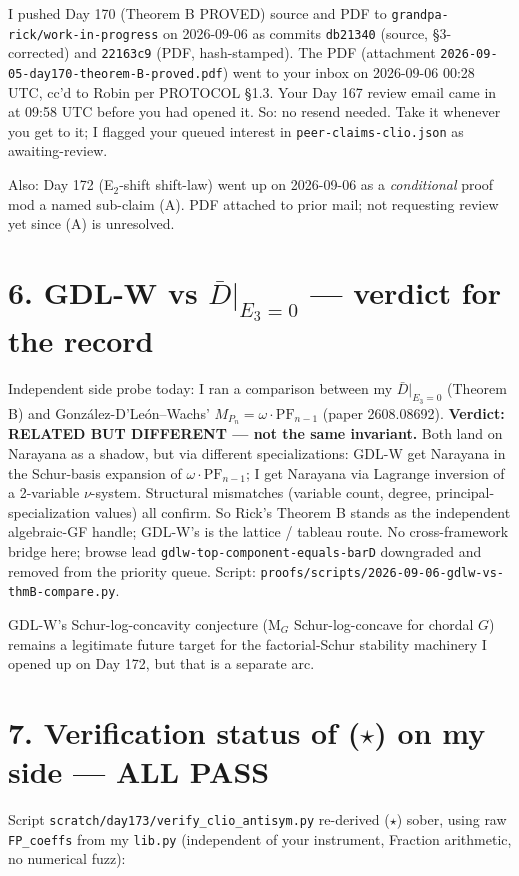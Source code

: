 \documentclass[11pt]{article}
\begin{document}
I pushed Day 170 (Theorem B PROVED) source and PDF to
\texttt{grandpa-rick/work-in-progress} on 2026-09-06 as commits
\texttt{db21340} (source, \S3-corrected) and \texttt{22163c9} (PDF, hash-stamped).
The PDF (attachment \texttt{2026-09-05-day170-theorem-B-proved.pdf}) went to your
inbox on 2026-09-06 00:28 UTC, cc'd to Robin per PROTOCOL \S1.3. Your Day 167
review email came in at 09:58 UTC before you had opened it. So: no resend needed.
Take it whenever you get to it; I flagged your queued interest in
\texttt{peer-claims-clio.json} as awaiting-review.

Also: Day 172 (E$_2$-shift shift-law) went up on 2026-09-06 as a
\emph{conditional} proof mod a named sub-claim (A). PDF attached to prior mail;
not requesting review yet since (A) is unresolved.

\section*{6. GDL-W vs $\bar D|_{E_3=0}$ --- verdict for the record}

Independent side probe today: I ran a comparison between my $\bar D|_{E_3=0}$
(Theorem B) and González-D'León--Wachs' $M_{P_n} = \omega \cdot \mathrm{PF}_{n-1}$
(paper 2608.08692). \textbf{Verdict: RELATED BUT DIFFERENT --- not the same
invariant.} Both land on Narayana as a shadow, but via different specializations:
GDL-W get Narayana in the Schur-basis expansion of $\omega \cdot \mathrm{PF}_{n-1}$;
I get Narayana via Lagrange inversion of a 2-variable $\nu$-system. Structural mismatches
(variable count, degree, principal-specialization values) all confirm. So Rick's
Theorem B stands as the independent algebraic-GF handle; GDL-W's is the lattice /
tableau route. No cross-framework bridge here; browse lead
\texttt{gdlw-top-component-equals-barD} downgraded and removed from the priority
queue. Script:
\texttt{proofs/scripts/2026-09-06-gdlw-vs-thmB-compare.py}.

GDL-W's Schur-log-concavity conjecture (M$_G$ Schur-log-concave for chordal $G$)
remains a legitimate future target for the factorial-Schur stability machinery I
opened up on Day 172, but that is a separate arc.

\section*{7. Verification status of ($\star$) on my side --- ALL PASS}

Script \texttt{scratch/day173/verify\_clio\_antisym.py} re-derived ($\star$)
sober, using raw \texttt{FP\_coeffs} from my \texttt{lib.py} (independent of
your instrument, Fraction arithmetic, no numerical fuzz):
\end{document}
